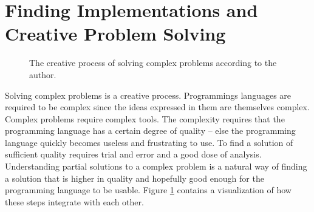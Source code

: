 \section{Finding Implementations and Creative Problem Solving}

\begin{center}
\begin{figure}[h!]
\centering
{}
\caption{The creative process of solving complex problems according to the author.}
\label{figCreativeProcess}
\end{figure}
\end{center}

Solving complex problems is a creative process. Programmings languages are required to be complex since the ideas expressed in them are themselves complex. Complex problems require complex tools. The complexity requires that the programming language
has a certain degree of quality -- else the programming language quickly becomes useless and frustrating to use. To find a solution of sufficient quality requires trial and error and a good dose of analysis. Understanding partial solutions to a complex problem is a natural way of finding a solution that is higher in quality and hopefully good enough for the programming language to be usable. Figure \ref{figCreativeProcess} contains a visualization of how these steps integrate with each other.

